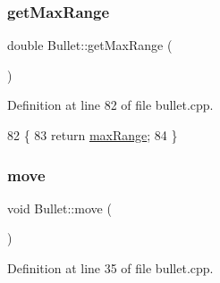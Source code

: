 \subsubsection{\texorpdfstring{get\+Max\+Range}{getMaxRange}}
{\footnotesize\ttfamily double Bullet\+::get\+Max\+Range (\begin{DoxyParamCaption}{ }\end{DoxyParamCaption})\hspace{0.3cm}{\ttfamily [slot]}}



Definition at line 82 of file bullet.\+cpp.


\begin{DoxyCode}
82                           \{
83     \textcolor{keywordflow}{return} \hyperlink{class_bullet_ae7c4fadfcc22643cb271622fe8bb2eb0}{maxRange};
84 \}
\end{DoxyCode}
\mbox{\label{class_bullet_a6140db968c42c05e829e142f74f20b16}} 
\subsubsection{\texorpdfstring{move}{move}}
{\footnotesize\ttfamily void Bullet\+::move (\begin{DoxyParamCaption}{ }\end{DoxyParamCaption})\hspace{0.3cm}{\ttfamily [slot]}}



Definition at line 35 of file bullet.\+cpp.


